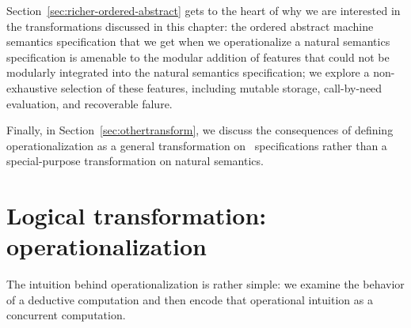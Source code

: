 Section~\ref{sec:richer-ordered-abstract} gets to the heart of why we
are interested in the transformations discussed in this chapter: the
ordered abstract machine semantics specification that we get when we
operationalize a natural semantics specification is amenable to the
modular addition of features that could not be modularly integrated
into the natural semantics specification; we explore a non-exhaustive
selection of these features, including mutable storage, call-by-need
evaluation, and recoverable falure.

Finally, in Section~\ref{sec:othertransform}, we discuss the
consequences of defining operationalization as a general
transformation on \sls~specifications rather than a special-purpose
transformation on natural semantics.









\section{Logical transformation: operationalization}
\label{sec:operationalization}

The intuition behind operationalization is rather simple: we examine
the behavior of a deductive computation and then encode that
operational intuition as a concurrent computation. 

